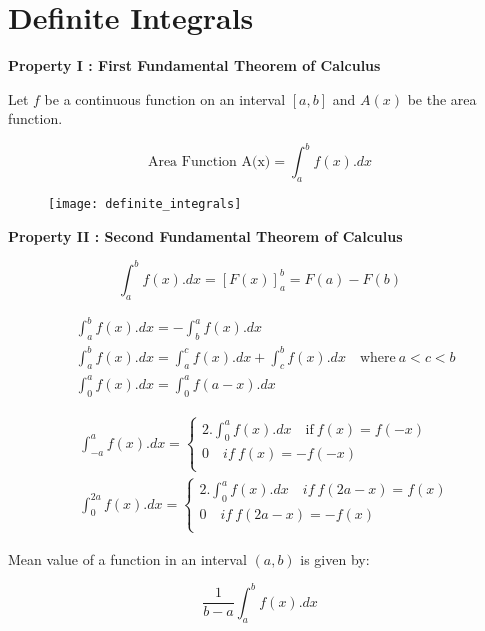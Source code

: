 \section{ Definite Integrals}

\textbf{Property I : First Fundamental Theorem of Calculus}

\vspace{5mm}
Let $f$ be a continuous function on an interval $[a,b]$ and $A(x)$ be the area function.

\vspace{2mm}

\begin{tcolorbox}
\begin{center}
\[ \text{Area Function A(x)} = \int_{a}^{b} f(x).dx \]
\end{center}
\end{tcolorbox}

\begin{figure}[ht]
    \centering
    \texttt{[image: definite\_integrals]} 
    \label{definite_int}
\end{figure}


\textbf{Property II : Second Fundamental Theorem of Calculus}

\vspace{5mm}

\begin{tcolorbox}
\begin{center}
\[\int_{a}^{b} f(x).dx = [F(x)]^{b}_{a} = F(a) - F(b) \]
\end{center}
\end{tcolorbox}

\vspace{5mm}

\begin{align}
&\int^{b}_{a} f(x).dx = - \int^{a}_{b} f(x).dx \\[5mm]
&\int^{b}_{a} f(x).dx = \int^{c}_{a} f(x).dx + \int^{b}_{c} f(x).dx \quad \text{where} \: a<c<b \\[5mm]
&\int^{a}_{0}f(x).dx = \int^{a}_{0}f(a-x).dx
\end{align}

\begin{align}
&\int^{a}_{-a}f(x).dx = 
\begin{cases}
2.\int^{a}_{0} f(x).dx \quad \text{if} \: f(x) = f(-x) \\
0 \quad if \: f(x) = -f(-x) \\
\end{cases}
\\[5mm]
&\int^{2a}_{0}f(x).dx = 
\begin{cases}
2.\int^{a}_{0}f(x).dx \quad if \: f(2a-x) = f(x) \\
0 \quad if \: f(2a-x) = -f(x) \\
\end{cases}
\end{align}

\vspace{5mm}

Mean value of a function in an interval $(a,b)$ is given by:

\begin{tcolorbox}
\begin{center}
\[ \frac{1}{b-a} \int_{a}^{b} f(x).dx \]
\end{center}
\end{tcolorbox}